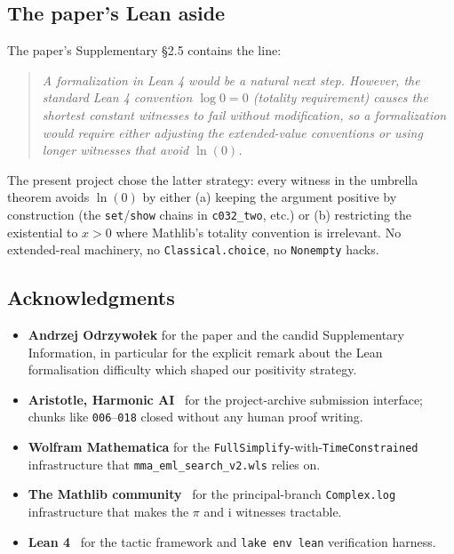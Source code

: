 \documentclass[11pt,a4paper]{article}
\theoremstyle{plain}
\theoremstyle{definition}
\newcommand{\imu}{\mathrm{i}}
\begin{document}
\subsection{The paper's Lean aside}

The paper's Supplementary §2.5 contains the line:

\begin{quote}\itshape
A formalization in Lean 4 would be a natural next step.  However, the
standard Lean 4 convention $\log 0 = 0$ (totality requirement) causes
the shortest constant witnesses to fail without modification, so a
formalization would require either adjusting the extended-value
conventions or using longer witnesses that avoid $\ln(0)$.
\end{quote}

The present project chose the latter strategy: every witness in
the umbrella theorem avoids $\ln(0)$ by either (a) keeping the argument
positive by construction (the \texttt{set}/\texttt{show} chains in
\texttt{c032\_two}, etc.) or (b) restricting the existential to
$x>0$ where Mathlib's totality convention is irrelevant.  No extended-real
machinery, no \texttt{Classical.choice}, no \texttt{Nonempty} hacks.

\subsection{Acknowledgments}

\begin{itemize}[leftmargin=*,nosep]
\item \textbf{Andrzej Odrzywo\l{}ek} for the paper and the candid
Supplementary Information, in particular for the explicit remark about
the Lean formalisation difficulty which shaped our positivity strategy.
\item \textbf{Aristotle, Harmonic AI}~\cite{harmonic2026} for the
project-archive submission interface; chunks like
\texttt{006}--\texttt{018} closed without any human proof writing.
\item \textbf{Wolfram Mathematica} for the
\texttt{FullSimplify}-with-\texttt{TimeConstrained} infrastructure that
\texttt{mma\_eml\_search\_v2.wls} relies on.
\item \textbf{The Mathlib community}~\cite{mathlib2024} for the
principal-branch \texttt{Complex.log} infrastructure that makes the
$\pi$ and $\imu$ witnesses tractable.
\item \textbf{Lean 4}~\cite{leanprover2021} for the tactic framework and
\texttt{lake env lean} verification harness.
\end{itemize}
\end{document}
